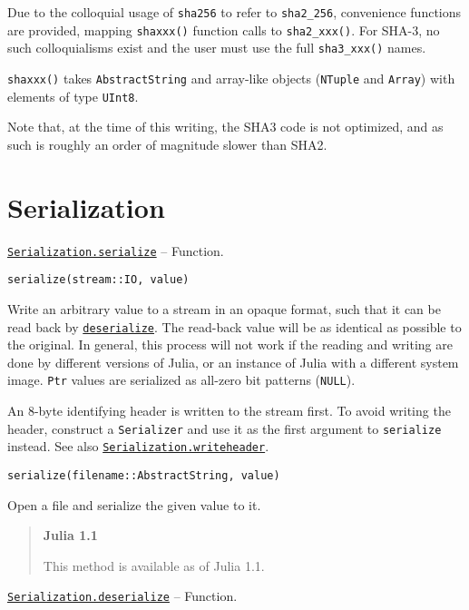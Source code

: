 Due to the colloquial usage of \texttt{sha256} to refer to \texttt{sha2\_256}, convenience functions are provided, mapping \texttt{shaxxx()} function calls to \texttt{sha2\_xxx()}.  For SHA-3, no such colloquialisms exist and the user must use the full \texttt{sha3\_xxx()} names.



\texttt{shaxxx()} takes \texttt{AbstractString} and array-like objects (\texttt{NTuple} and \texttt{Array}) with elements of type \texttt{UInt8}.



Note that, at the time of this writing, the SHA3 code is not optimized, and as such is roughly an order of magnitude slower than SHA2.



\hypertarget{9056089688914067988}{}


\chapter{Serialization}


\hypertarget{17931089632175850899}{} 
\hyperlink{17931089632175850899}{\texttt{Serialization.serialize}}  -- {Function.}

\begin{adjustwidth}{2em}{0pt}


\begin{verbatim}
serialize(stream::IO, value)
\end{verbatim}

Write an arbitrary value to a stream in an opaque format, such that it can be read back by \hyperlink{5889257128684048834}{\texttt{deserialize}}. The read-back value will be as identical as possible to the original. In general, this process will not work if the reading and writing are done by different versions of Julia, or an instance of Julia with a different system image. \texttt{Ptr} values are serialized as all-zero bit patterns (\texttt{NULL}).

An 8-byte identifying header is written to the stream first. To avoid writing the header, construct a \texttt{Serializer} and use it as the first argument to \texttt{serialize} instead. See also \hyperlink{165660671771374050}{\texttt{Serialization.writeheader}}.




\begin{lstlisting}
serialize(filename::AbstractString, value)
\end{lstlisting}

Open a file and serialize the given value to it.

\begin{quote}
\textbf{Julia 1.1}

This method is available as of Julia 1.1.

\end{quote}


\end{adjustwidth}
\hypertarget{5889257128684048834}{} 
\hyperlink{5889257128684048834}{\texttt{Serialization.deserialize}}  -- {Function.}

